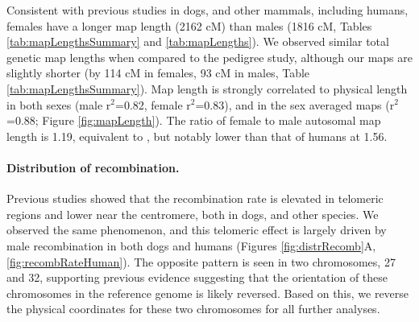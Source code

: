 
Consistent with previous studies in dogs\cite{Wong2010,Mellersh1997,Neff1999}, and other mammals, including humans\cite{Coop2008,Campbell2015}, females have a longer map length (2162 cM) than males (1816 cM, Tables \ref{tab:mapLengthsSummary} and \ref{tab:mapLengths}).
We observed similar total genetic map lengths when compared to the \citet{Wong2010} pedigree study, although our maps are slightly shorter (by 114 cM in females, 93 cM in males, Table \ref{tab:mapLengthsSummary}).
Map length is strongly correlated to physical length in both sexes (male r$^2$=0.82, female r$^2$=0.83), and in the sex averaged maps (r$^2$=0.88; Figure \ref{fig:mapLength}).
The ratio of female to male autosomal map length is 1.19, equivalent to \citet{Wong2010}, but notably lower than that of humans at 1.56\cite{Campbell2015}.

\paragraph{Distribution of recombination.}
Previous studies showed that the recombination rate is elevated in telomeric regions and lower near the centromere, both in dogs\cite{Wong2010,Axelsson2012,Auton2013}, and other species\cite{DeMassy2013}.
We observed the same phenomenon, and this telomeric effect is largely driven by male recombination in both dogs and humans (Figures \ref{fig:distrRecomb}A, \ref{fig:recombRateHuman}).
The opposite pattern is seen in two chromosomes, 27 and 32, supporting previous evidence\cite{Wong2010} suggesting that the orientation of these chromosomes in the reference genome is likely reversed.
Based on this, we reverse the physical coordinates for these two chromosomes for all further analyses.

